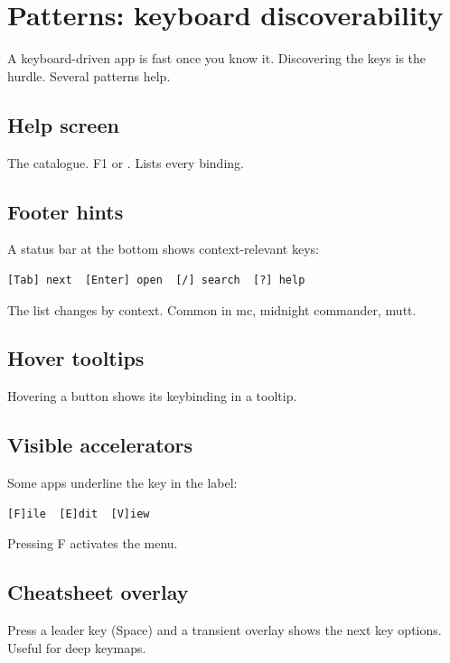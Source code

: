 \chapter{Patterns: keyboard discoverability}
\label{ch:keydisc}

\begin{aside}
A keyboard-driven app is fast once you know it. Discovering
the keys is the hurdle. Several patterns help.
\end{aside}

\section{Help screen}

The catalogue. F1 or . Lists every binding.

\section{Footer hints}

A status bar at the bottom shows context-relevant keys:

\begin{lstlisting}
[Tab] next  [Enter] open  [/] search  [?] help
\end{lstlisting}

The list changes by context. Common in mc, midnight
commander, mutt.

\section{Hover tooltips}

Hovering a button shows its keybinding in a tooltip.

\section{Visible accelerators}

Some apps underline the key in the label:

\begin{lstlisting}
[F]ile  [E]dit  [V]iew
\end{lstlisting}

Pressing F activates the menu.

\section{Cheatsheet overlay}

Press a leader key (Space) and a transient overlay shows
the next key options. Useful for deep keymaps.


